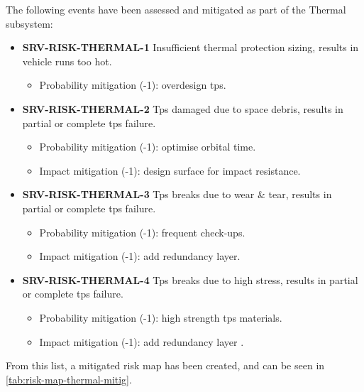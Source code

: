 \noindent The following events have been assessed and mitigated as part of the Thermal subsystem:

\begin{itemize}
	 \item \textbf{SRV-RISK-THERMAL-1} Insufficient thermal protection sizing, results in vehicle runs too hot.
	\begin{itemize}
		 \item Probability mitigation (-1):  overdesign tps.	\end{itemize}
	 \item \textbf{SRV-RISK-THERMAL-2} Tps damaged due to space debris, results in partial or complete tps failure.
	\begin{itemize}
		 \item Probability mitigation (-1):  optimise orbital time.		 \item Impact mitigation (-1): design surface for impact resistance.	\end{itemize}
	 \item \textbf{SRV-RISK-THERMAL-3} Tps breaks due to wear \& tear, results in partial or complete tps failure.
	\begin{itemize}
		 \item Probability mitigation (-1):  frequent check-ups.		 \item Impact mitigation (-1):  add redundancy layer.	\end{itemize}
	 \item \textbf{SRV-RISK-THERMAL-4} Tps breaks due to high stress, results in partial or complete tps failure.
	\begin{itemize}
		 \item Probability mitigation (-1):  high strength tps materials.		 \item Impact mitigation (-1):  add redundancy layer .	\end{itemize}
\end{itemize}

\noindent From this list, a mitigated risk map has been created, and can be seen in \autoref{tab:risk-map-thermal-mitig}.

